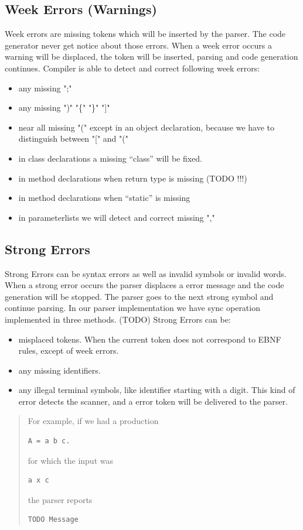 \subsection{Week Errors (Warnings)}
\label{label_week_errors}
Week errors are missing tokens which will be inserted by the parser.
The code generator never get notice about those errors. When a week error occurs a warning will be displaced, the token will be
inserted, parsing and code generation continues.
Compiler is able to detect and correct following week errors:
\begin{itemize}
  \item any missing ";"
  \item any missing ")" "\{" "\}" "]" 
  \item near all missing "(" except in an object declaration, because we have to distinguish between "[" and "(" 
  \item in class declarations a missing ``class'' will be fixed.
  \item in method declarations when return type is missing (TODO !!!)
  \item in method declarations when ``static'' is missing
  \item in parameterlists we will detect and correct missing ","
\end{itemize}

\subsection{Strong Errors}
\label{label_strong_errors}
Strong Errors can be syntax errors as well as invalid symbols or invalid words. When a strong error occurs the parser displaces a error
message and the code generation will be stopped. The parser goes to the next strong symbol and continue parsing. In our parser
implementation we have sync operation implemented in three methods. (TODO)
Strong Errors can be:
\begin{itemize}
  \item misplaced tokens. When the current token does not correspond to EBNF rules, except of week errors.
  \item any missing identifiers.
  \item any illegal terminal symbols, like identifier starting with a digit. This kind of error detects the scanner, and a
  error token will be delivered to the parser.
\end{itemize}
\begin{quote}
For example, if we had a production
\begin{verbatim}
A = a b c.
\end{verbatim}
for which the input was
\begin{verbatim}
a x c
\end{verbatim}
the parser reports
\begin{verbatim}
TODO Message
\end{verbatim}
\end{quote}
